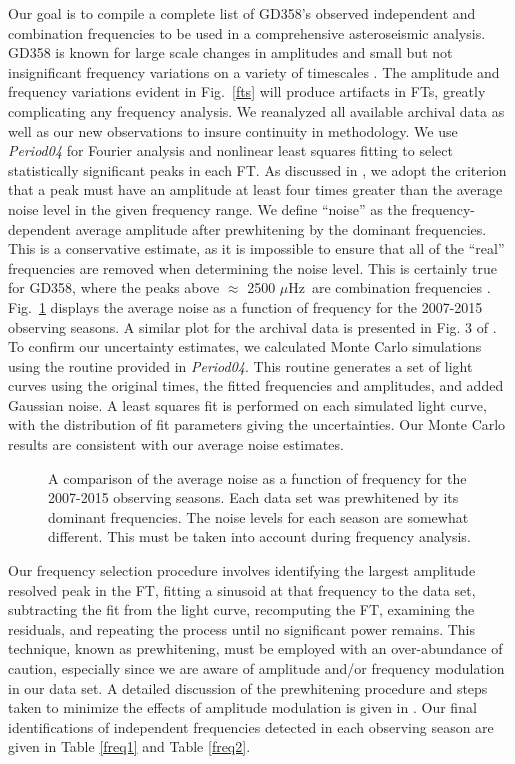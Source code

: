 \documentclass[12pt,preprint]{aastex}
\begin{document}
Our goal is to compile a complete list of GD358's observed independent and combination frequencies 
to be used in a comprehensive asteroseismic analysis. GD358 is known for large scale changes in 
amplitudes and small but not insignificant frequency variations on a variety of timescales 
\citep{Provencal09}.  The amplitude and frequency variations evident in Fig.~\ref{fts} will 
produce artifacts in FTs, greatly complicating any frequency analysis.  
We reanalyzed all available archival data \citep{Provencal09, Kepler03, Winget94, Winget82} 
as well as our new observations to insure continuity in methodology.  We use 
{\sl Period04} \citep{Lenz05} for Fourier analysis and nonlinear least squares fitting to 
select statistically significant peaks in each FT.  As discussed in \citet{Provencal12}, 
we adopt the criterion that a peak must have an amplitude at least four times greater than the 
average noise level in the given frequency range. We define ``noise'' as the frequency-dependent 
average amplitude after prewhitening by the dominant frequencies. This is a conservative estimate, 
as it is impossible to ensure that all of the ``real'' frequencies are removed when determining
the noise level. This is certainly true for GD358, where the peaks above $\approx$ 2500 $\mu$Hz\ 
are combination frequencies \citep{Provencal09}.  Fig.~\ref{noise} displays the average noise 
as a function of frequency for the 2007-2015 observing seasons. A similar plot for the 
archival data is presented in Fig. 3 of \citet{Provencal09}. To confirm our uncertainty 
estimates, we calculated Monte Carlo simulations using the routine provided in {\sl Period04}.  
This routine generates a set of light curves using the original times, the fitted frequencies and 
amplitudes, and added Gaussian noise. A least squares fit is performed on each simulated light 
curve, with the distribution of fit parameters giving the uncertainties. Our Monte Carlo results 
are consistent with our average noise estimates.

\begin{figure}
\caption{A comparison of the average noise as a function of frequency for the 2007-2015 observing 
seasons.  Each data set was prewhitened by its dominant frequencies.  The noise levels for each 
season are somewhat different.  This must be taken into account during frequency analysis.  
\label{noise}
}
\end{figure}

Our frequency selection procedure involves identifying the largest amplitude resolved peak in the FT,
fitting a sinusoid at that frequency to the data set, subtracting the fit from the light curve, 
recomputing the FT, examining the residuals, and repeating the process until no significant power 
remains. This technique, known as prewhitening, must be employed with an over-abundance of caution, 
especially since we are aware of amplitude and/or frequency modulation in our data set. A detailed
discussion of the prewhitening procedure and steps taken to minimize the effects of amplitude 
modulation is given in \citep{Provencal09}. Our final identifications of independent frequencies
detected in each observing season are given in Table \ref{freq1} and Table \ref{freq2}.
\end{document}
